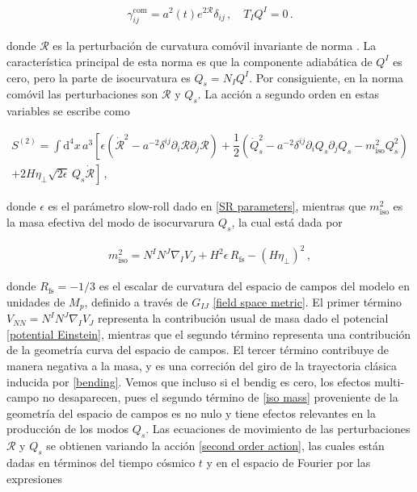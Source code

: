 \documentclass[12pt,a4paper,english,nofootinbib]{revtex4}
\newcommand{\dif}{\mathrm{d}}
\newcommand{\beq}{\begin{eqnarray}}
\newcommand{\enq}{\end{eqnarray}}
\begin{document}
\beq 
\gamma_{ij}^\mathrm{com} = a^2(t)e^{2\mathcal{R}}\delta_{ij}\,,\quad T_I Q^I = 0\,.
\label{3-metric}
\enq 

donde $\mathcal{R}$ es la perturbación de curvatura comóvil invariante de norma \cite{MUKHANOV1992}. La característica principal de esta norma es que la componente adiabática de $Q^I$ es cero, pero la parte de isocurvatura es $Q_s = N_I Q^I$. Por consiguiente, en la norma comóvil las perturbaciones son $\mathcal{R}$ y $Q_s$. La acción a segundo orden en estas variables se escribe como 

\begin{multline}
     S^{(2)} = \int \dif^4 x\, a^3\left[ \epsilon\left(\dot{\mathcal{R}}^2-a^{-2}\delta^{ij}\partial_i\mathcal{R}\partial_j\mathcal{R}\right) + \dfrac{1}{2}\left(\dot{Q}_s^2-a^{-2}\delta^{ij}\partial_iQ_s \partial_j Q_s- m_\mathrm{iso}^2Q_s^2\right)\right. \\
     \left.+ 2H \eta_\perp \sqrt{2\epsilon}\, Q_s \dot{\mathcal{R}} \right]\,,
        \label{second order action}
\end{multline}

donde $\epsilon$ es el parámetro slow-roll dado en \eqref{SR parameters}, mientras que $m^2_\text{iso}$ es la masa efectiva del modo de isocurvarura $Q_s$, la cual está dada por 

\beq 
    m_\mathrm{iso}^2 = N^I N^J \nabla_I V_J + H^2\epsilon\,R_\text{fs}-(H\eta_\perp)^2\,,
    \label{iso mass}
\enq 

donde $R_\text{fs} = -1/3$  es el escalar de curvatura del espacio de campos del modelo en unidades de $M_p$, definido a través de $G_{IJ}$ \eqref{field space metric}. El primer término  $V_{NN} = N^I N^J \nabla_I V_J$ representa la contribución usual de masa dado el potencial \eqref{potential Einstein}, mientras que el segundo término representa una contribución de la geometría curva del espacio de campos. El tercer término contribuye de manera negativa a la masa, y es una correción del giro de la trayectoria clásica inducida por \eqref{bending}. Vemos que incluso si el bendig es cero, los efectos multi-campo no desaparecen, pues el segundo término de \eqref{iso mass} proveniente de la geometría del espacio de campos es no nulo y  tiene efectos relevantes en la producción de los modos $Q_s$.  Las ecuaciones de movimiento de las perturbaciones $\mathcal{R}$ y $Q_s$ se obtienen variando la acción \eqref{second order action}, las cuales están dadas en términos del tiempo cósmico $t$ y en el espacio de Fourier por las expresiones 
\end{document}
